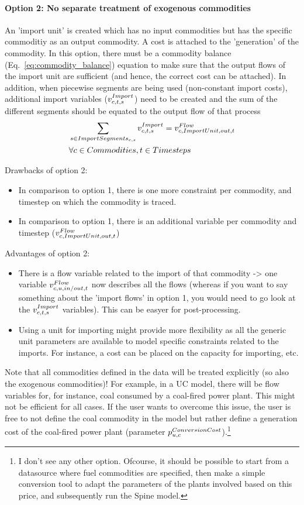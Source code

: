 \paragraph{Option 2: No separate treatment of exogenous commodities}
An 'import unit' is created which has no input commodities but has the specific commoditiy as an output commodity. A cost is attached to the 'generation' of the commodity. In this option, there must be a commodity balance (Eq.~\eqref{eq:commodity_balance}) equation to make sure that the output flows of the import unit are sufficient (and hence, the correct cost can be attached). In addition, when piecewise segments are being used (non-constant import costs), additional import variables ($\vImport$) need to be created and the sum of the different segments should be equated to the output flow of that process
\begin{align}
&\sum_{\segment \in \ImportSegments} \vImport =  \vFlow[\commodity,ImportUnit,out,\timestep] \nonumber \\
& \forall \commodities, \timesteps
\end{align}

Drawbacks of option 2:
\begin{itemize} 
	\item In comparison to option 1, there is one more constraint per commodity, and timestep on which the commodity is traced.
	\item In comparison to option 1, there is an additional variable per commodity and timestep ($\vFlow[\commodity,ImportUnit,out,\timestep]$)
\end{itemize}
Advantages of option 2:
\begin{itemize}
	\item There is a flow variable related to the import of that commodity -> one variable $\vFlow$ now describes all the flows (whereas if you want to say something about the 'import flows' in option 1, you would need to go look at the $\vImport$ variables). This can be easyer for post-processing.
	\item Using a unit for importing might provide more flexibility as all the generic unit parameters are available to model specific constraints related to the imports. For instance, a cost can be placed on the capacity for importing, etc. 
\end{itemize}


Note that all commodities defined in the data will be treated explicitly (so also the exogenous commodities)! For example, in a UC model, there will be flow variables for, for instance, coal consumed by a coal-fired power plant. This might not be efficient for all cases. If the user wants to overcome this issue, the user is free to not define the coal commodity in the model but rather define a generation cost of the coal-fired power plant (parameter $\pConversionCost$).\footnote{I don't see any other option. Ofcourse, it should be possible to start from a datasource where fuel commodities are specified, then make a simple conversion tool to adapt the parameters of the plants involved based on this price, and subsequently run the Spine model.} 
